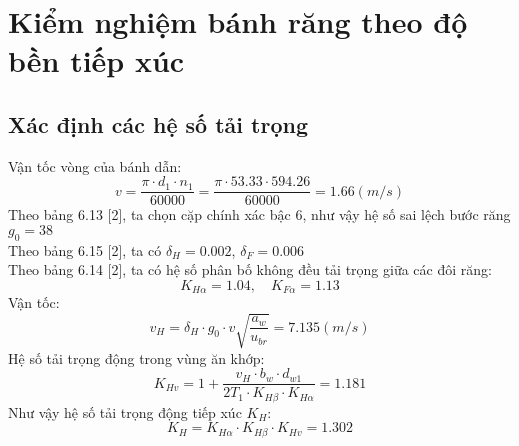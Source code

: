 \section{Kiểm nghiệm bánh răng theo độ bền tiếp xúc}
\subsection{Xác định các hệ số tải trọng}
Vận tốc vòng của bánh dẫn:
\begin{equation}
v = \frac{\pi \cdot d_1 \cdot n_1}{60000} = \frac{\pi \cdot 53.33 \cdot 594.26}{60000} = 1.66(m/s)
\end{equation}
Theo bảng 6.13 [2], ta chọn cặp chính xác bậc 6, như vậy hệ số sai lệch bước răng $g_0 = 38$  \\
Theo bảng 6.15 [2], ta có $\delta_H = 0.002$, $\delta_F = 0.006$  \\
Theo bảng 6.14 [2], ta có hệ số phân bố không đều tải trọng giữa các đôi răng:\\
\begin{equation}
K_{H\alpha} = 1.04, \quad K_{F\alpha} = 1.13
\end{equation}
Vận tốc:
\begin{equation}
v_H = \delta_H \cdot g_0 \cdot v\sqrt{\frac{a_w}{u_{br}}} = 7.135(m/s)
\end{equation}
Hệ số tải trọng động trong vùng ăn khớp:
\begin{equation}
K_{Hv} = 1 + \frac{v_H \cdot b_w \cdot d_{w1}}{2T_1 \cdot K_{H\beta} \cdot K_{H\alpha}} = 1.181
\end{equation}
Như vậy hệ số tải trọng động tiếp xúc $K_H$:
\begin{equation}
K_H = K_{H\alpha} \cdot K_{H\beta} \cdot K_{Hv} = 1.302
\end{equation}


